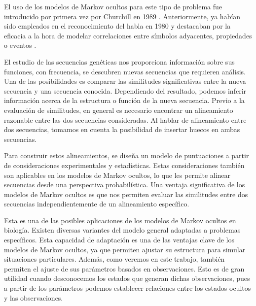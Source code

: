 El uso de los modelos de Markov ocultos para este tipo de problema fue introducido por primera vez por Churchill en 1989 \cite{Churchill}. Anteriormente, ya habían sido empleados en el reconocimiento del habla en 1980 \cite{Ferguson} y destacaban por la eficacia a la hora de modelar correlaciones entre símbolos adyacentes, propiedades o eventos \cite{Rabiner}. 

El estudio de las secuencias genéticas nos proporciona información sobre sus funciones, con frecuencia, se descubren nuevas secuencias que requieren análisis. Una de las posibilidades es comparar las similitudes significativas entre la nueva secuencia y una secuencia conocida. Dependiendo del resultado, podemos inferir información acerca de la estructura o función de la nueva secuencia. Previo a la evaluación de similitudes, en general es necesario encontrar un alineamiento razonable entre las dos secuencias consideradas. Al hablar de alineamiento entre dos secuencias, tomamos en cuenta la posibilidad de insertar huecos en ambas secuencias. 

\iffalse
Supongamos que tenemos dos secuencias de ADN: 
\[x=TACGAACTG \qquad y=TCGTAACGTA\]
Un alineamiento razonable podría ser el siguiente:
\[\begin{array}{c c c c c c c c c c c}
    T& A& C& G& -& A& A& C& -& T& G \\
    T& -& C& G& T& A& A& C& G& T& A
\end{array}\]
podemos observar que, al insertar huecos en las secuencias, logramos alinear símbolos iguales en ambas secuencias.\fi

Para construir estos alineamientos, se diseña un modelo de puntuaciones a partir de consideraciones experimentales y estadísticas. Estas consideraciones también son aplicables en los modelos de Markov ocultos, lo que les permite alinear secuencias desde una perspectiva probabilística. Una ventaja significativa de los modelos de Markov ocultos es que nos permiten evaluar las similitudes entre dos secuencias independientemente de un alineamiento específico.

Esta es una de las posibles aplicaciones de los modelos de Markov ocultos en biología. Existen diversas variantes del modelo general adaptadas a problemas específicos. Esta capacidad de adaptación es una de las ventajas clave de los modelos de Markov ocultos, ya que permiten ajustar su estructura para simular situaciones particulares. Además, como veremos en este trabajo, también permiten el ajuste de sus parámetros basados en observaciones. Esto es de gran utilidad cuando desconocemos los estados que generan dichas observaciones, pues a partir de los parámetros podemos establecer relaciones entre los estados ocultos y las observaciones.

